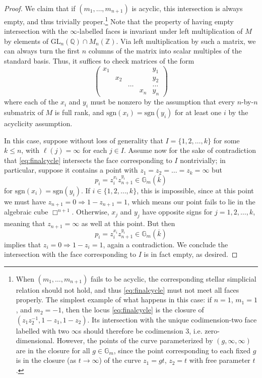 \documentclass[10pt,a4paper]{amsart}
\newcommand{\sgn}{\mathrm{sgn}}
\begin{document}
\begin{proof}
        We claim that if $(m_1,\ldots, m_{n+1})$ is acyclic, this intersection is always empty, and thus trivially proper.\footnote{When $(m_1,\ldots, m_{n+1})$ fails to be acyclic, the corresponding stellar simplicial relation should not hold, and thus \eqref{eq:finalcycle} must not meet all faces properly. The simplest example of what happens in this case: if $n=1$, $m_1=1$, and $m_2=-1$, then the locus \eqref{eq:finalcycle} is the closure of $(z_1z_2^{-1},1-z_1,1-z_2)$. Its intersection with the unique codimension-two face labelled with two $\infty$s should therefore be codimension $3$, i.e. zero-dimensional. However, the points of the curve parameterized by $(g,\infty,\infty)$ are in the closure for all $g\in \mathbb{G}_m$, since the point corresponding to each fixed $g$ is in the closure (as $t\to \infty$) of the curve $z_1=gt$, $z_2=t$ with free parameter $t$.} Note that the property of having empty intersection with the $\infty$-labelled faces is invariant under left multiplication of $M$ by elements of $\mathrm{GL}_n(\mathbb{Q})\cap M_n(\mathbb{Z})$. Via left multiplication by such a matrix, we can always turn the first $n$ columns of the matrix into scalar multiples of the standard basis. Thus, it suffices to check matrices of the form
        \[
        \begin{pmatrix}
        x_1 &  & & & y_1 \\
            & x_2    &  & & y_2 \\
            &      & \ldots &  & \ldots \\
            &        & & x_n   & y_n
        \end{pmatrix}
        \]
        where each of the $x_i$ and $y_i$ must be nonzero by the assumption that every $n$-by-$n$ submatrix of $M$ is full rank, and $\sgn(x_i)=\sgn(y_i)$ for at least one $i$ by the acyclicity assumption.

        In this case, suppose without loss of generality that $I=\{1,2,\ldots, k\}$ for some $k\le n$, with $\ell(j)=\infty$ for each $j\in I$. Assume now for the sake of contradiction that \eqref{eq:finalcycle} intersects the face corresponding to $I$ nontrivially; in particular, suppose it contains a point with $z_1=z_2=\ldots=z_k=\infty$ but 
        \[
        p_i=z_i^{x_i}z_{n+1}^{y_i} \in \mathbb{G}_m(\overline{k})
        \]
        for $\sgn(x_i)=\sgn(y_i)$. If $i\in \{1,2,\ldots, k\}$, this is impossible, since at this point we must have $z_{n+1}=0\Rightarrow 1-z_{n+1}=1$, which means our point fails to lie in the algebraic cube $\Box^{n+1}$. Otherwise, $x_j$ and $y_j$ have opposite signs for $j=1,2,\ldots, k$, meaning that $z_{n+1}=\infty$ as well at this point. But then
        \[
        p_i=z_i^{x_i}z_{n+1}^{y_i} \in \mathbb{G}_m(\overline{k})
        \]
        implies that $z_i=0\Rightarrow 1-z_{i}=1$, again a contradiction. We conclude the intersection with the face corresponding to $I$ is in fact empty, as desired.


\end{proof}
\end{document}
